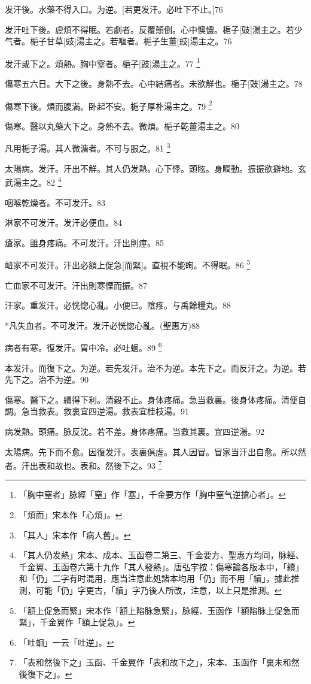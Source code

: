 \documentclass[12pt,twoside,UTF8,b5paper]{ctexbook}
\begin{document}
发汗後。水藥不得入口。为逆。[若更发汗。必吐下不止。]76

发汗吐下後。虗煩不得眠。若劇者。反覆顛倒。心中懊憹。梔子[豉]湯主之。若少气者。梔子甘草[豉]湯主之。若嘔者。梔子生薑[豉]湯主之。76

发汗或下之。煩熱。胸中窒者。梔子[豉]湯主之。77
	\footnote{「胸中窒者」脉經「窒」作「塞」，千金要方作「胸中窒气逆搶心者」。}

傷寒五六日。大下之後。身熱不去。心中結痛者。未欲觧也。梔子[豉]湯主之。78

傷寒下後。煩而腹滿。卧起不安。梔子厚朴湯主之。79
	\footnote{「煩而」宋本作「心煩」。}

傷寒。醫以丸藥大下之。身熱不去。微煩。梔子乾薑湯主之。80

凡用梔子湯。其人微溏者。不可与服之。81
	\footnote{「其人」宋本作「病人舊」。}

太陽病。发汗。汗出不觧。其人仍发熱。心下悸。頭眩。身瞤動。振振欲擗地。玄武湯主之。82
	\footnote{「其人仍发熱」宋本、成本、玉函卷二第三、千金要方、聖惠方均同，脉經、千金翼、玉函卷六第十九作「其人發熱」。唐弘宇按：傷寒論各版本中，「續」和「仍」二字有时混用，應当注意此処諸本均用「仍」而不用「續」，據此推測，可能「仍」字更古，「續」字乃後人所改，注意，以上只是推測。}

咽喉乾燥者。不可发汗。83

淋家不可发汗。发汗必便血。84

瘡家。雖身疼痛。不可发汗。汗出則痙。85

衄家不可发汗。汗出必額上促急[而緊]。直視不能眴。不得眠。86
	\footnote{「額上促急而緊」宋本作「額上陷脉急緊」，脉經、玉函作「額陷脉上促急而緊」，千金翼作「額上促急」。}

亡血家不可发汗。汗出則寒慄而振。87

汗家。重发汗。必恍惚心亂。小便已。陰疼。与禹餘糧丸。88

*凡失血者。不可发汗。发汗必恍惚心亂。(聖惠方)88

病者有寒。復发汗。胃中冷。必吐蛔。89
	\footnote{「吐蛔」一云「吐逆」。}

本发汗。而復下之。为逆。若先发汗。治不为逆。本先下之。而反汗之。为逆。若先下之。治不为逆。90

傷寒。醫下之。續得下利。清穀不止。身体疼痛。急当救裏。後身体疼痛。清便自調。急当救表。救裏宜四逆湯。救表宜桂枝湯。91

病发熱。頭痛。脉反沈。若不差。身体疼痛。当救其裏。宜四逆湯。92

太陽病。先下而不愈。因復发汗。表裏俱虗。其人因冒。冒家当汗出自愈。所以然者。汗出表和故也。表和。然後下之。93
	\footnote{「表和然後下之」玉函、千金翼作「表和故下之」，宋本、玉函作「裏未和然後復下之」。}
\end{document}

